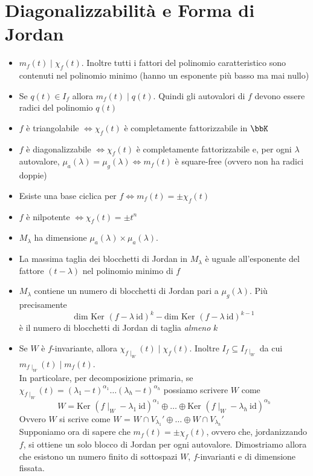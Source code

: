 \documentclass[a4paper,NoNotes]{stdmdoc}
\newcommand{\Ker}{\mbox{Ker } }
\newcommand{\Dim}{\mbox{dim }}
\newcommand{\Id}{\mbox{id}}
\newcommand{\sse}{\Leftrightarrow}
\begin{document}
	\section*{Diagonalizzabilità e Forma di Jordan}
	\begin{itemize}
		\item $m_f(t) \mid \chi_f(t)$. Inoltre tutti i fattori del polinomio caratteristico sono contenuti nel polinomio minimo (hanno un esponente più basso ma mai nullo)
		\item Se $q(t) \in I_f$ allora $m_f(t) \mid q(t)$. Quindi gli autovalori di $f$ devono essere radici del polinomio $q(t)$
		\item $f$ è triangolabile $\sse \chi_f(t)$ è completamente fattorizzabile in $\bbK$
		\item $f$ è diagonalizzabile $\sse \chi_f(t)$ è completamente fattorizzabile e, per ogni $\lambda$ autovalore, $\mu_a(\lambda) = \mu_g(\lambda) \sse m_f(t)$ è square-free (ovvero non ha radici doppie)
		\item Esiste una base ciclica per $f \sse m_f(t) = \pm \chi_f(t)$
		\item $f$ è nilpotente $\sse \chi_f(t) = \pm t^n$
		\item $M_\lambda$ ha dimensione $\mu_a(\lambda)\times\mu_a(\lambda)$.
		\item La massima taglia dei blocchetti di Jordan in $M_\lambda$ è uguale all'esponente del fattore $(t-\lambda)$ nel polinomio minimo di $f$
		\item $M_\lambda$ contiene un numero di blocchetti di Jordan pari a $\mu_g(\lambda)$. Più precisamente 
$$\Dim\Ker (f-\lambda\ \Id)^k-\Dim\Ker (f-\lambda\ \Id)^{k-1}$$
 è il numero di blocchetti di Jordan di taglia {\it almeno} $k$
		\item Se $W$ è $f$-invariante, allora $\chi_{f\mid_W}(t) \mid \chi_f(t)$. Inoltre $I_f \subseteq I_{f\mid_W}$ da cui $m_{f\mid_W}(t) \mid m_f(t)$. \\ In particolare, per decomposizione primaria, se $\chi_{f\mid_W}(t) = (\lambda_1-t)^{\alpha_1}\ldots(\lambda_h-t)^{\alpha_h}$ possiamo scrivere $W$ come $$W = \Ker (f\mid_W-\lambda_1\ \Id)^{\alpha_1} \oplus \ldots \oplus \Ker (f\mid_W-\lambda_h\ \Id)^{\alpha_h}$$ Ovvero $W$ si scrive come $W$ = $W\cap V_{\lambda_1}' \oplus \ldots \oplus W\cap V_{\lambda_h}'$ \\
		Supponiamo ora di sapere che $m_f(t) = \pm \chi_f(t)$, ovvero che, jordanizzando $f$, si ottiene un solo blocco di Jordan per ogni autovalore. Dimostriamo allora che esistono un numero finito di sottospazi $W$, $f$-invarianti e di dimensione fissata. \\

\end{itemize}
\end{document}
